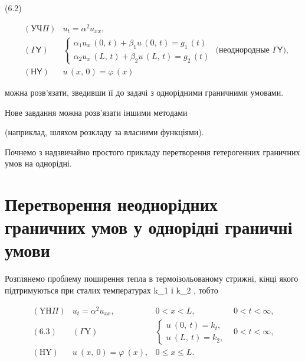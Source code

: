 \documentclass[
]{article}
\begin{document}
(6.2)

\[
\begin{aligned} & (\mathsf{У}\mathsf{Ч}\Pi) & u_t = \alpha^2 u_{xx}, \\ & (\mathsf{\Gamma}\mathsf{Y}) & \begin{cases} \alpha_1 u_x \, (0, \, t) + \beta_1 u \, (0, \, t) = g_1 \, (t) \\ \alpha_2 u_x \, (L, \, t) + \beta_2 u \, (L, \, t) = g_2 \, (t) \end{cases} \text{ (неоднородные } \mathsf{\Gamma}\mathsf{Y}), \\ & (\mathsf{H}\mathsf{Y}) & u \, (x, \, 0) = \varphi \, (x) \end{aligned}
\]

можна розв'язати, зведивши її до задачі з однорідними граничними
умовами.

Нове завдання можна розв'язати іншими методами

(наприклад, шляхом розкладу за власними функціями).

Почнемо з надзвичайно простого прикладу перетворення гетерогенних
граничних умов на однорідні.

\section{Перетворення неоднорідних граничних умов у однорідні граничні
умови}\label{ux43fux435ux440ux435ux442ux432ux43eux440ux435ux43dux43dux44f-ux43dux435ux43eux434ux43dux43eux440ux456ux434ux43dux438ux445-ux433ux440ux430ux43dux438ux447ux43dux438ux445-ux443ux43cux43eux432-ux443-ux43eux434ux43dux43eux440ux456ux434ux43dux456-ux433ux440ux430ux43dux438ux447ux43dux456-ux443ux43cux43eux432ux438}

Розглянемо проблему поширення тепла в термоізольованому стрижні, кінці
якого підтримуються при сталих температурах k\_1 і k\_2 , тобто

\[
\begin{aligned} (\mathrm{Y}\mathrm{H}\Pi) & u_t = \alpha^2 u_{xx}, & 0 < x < L, & 0 < t < \infty, \\ (6.3) & (\Gamma\mathrm{Y}) & \begin{cases} u \ (0, \ t) = k_t, \\ u \ (L, \ t) = k_2, \end{cases} & 0 < t < \infty, \\ (\mathrm{H}\mathrm{Y}) & u \ (x, \ 0) = \varphi \ (x), & 0 \leqslant x \leqslant L. \end{aligned}
\]
\end{document}
